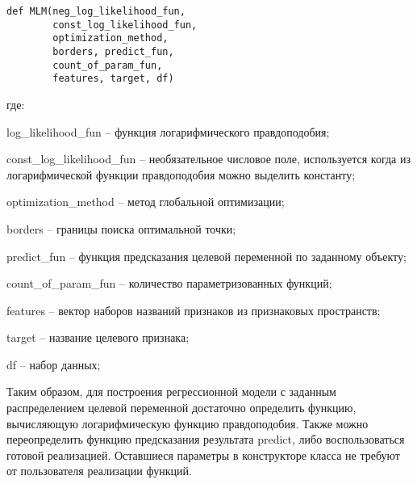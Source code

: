 \begin{verbatim}
def MLM(neg_log_likelihood_fun,
        const_log_likelihood_fun,
        optimization_method,
        borders, predict_fun,
        count_of_param_fun,
        features, target, df)
\end{verbatim}
где:
\begin{description}[font=$\bullet$]
    \item log\_likelihood\_fun -- функция логарифмического правдоподобия;
    \item const\_log\_likelihood\_fun -- необязательное числовое поле, используется когда из логарифмической функции правдоподобия можно выделить константу;
    \item optimization\_method -- метод глобальной оптимизации;
    \item borders -- границы поиска оптимальной точки;
    \item predict\_fun -- функция предсказания целевой переменной по заданному объекту;
    \item count\_of\_param\_fun -- количество параметризованных функций;
    \item features -- вектор наборов названий признаков из признаковых пространств;
    \item target -- название целевого признака;
    \item df -- набор данных;
\end{description}

Таким образом, для построения регрессионной модели с заданным распределением целевой переменной достаточно определить функцию, вычисляющую логарифмическую функцию правдоподобия. Также можно переопределить функцию предсказания результата predict, либо воспользоваться готовой реализацией. Оставшиеся параметры в конструкторе класса не требуют от пользователя реализации функций.

